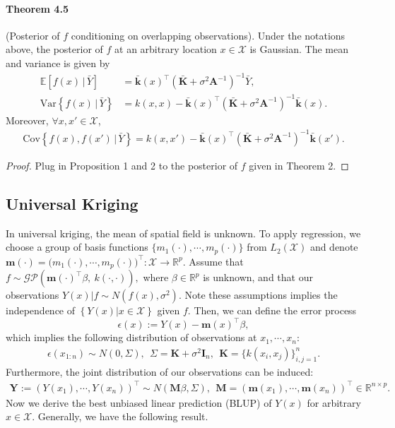 \documentclass{article}
\begin{document}
\paragraph{Theorem 4.5} (Posterior of $f$ conditioning on overlapping observations). Under the notations above, the posterior of $f$ at an arbitrary location $x\in\mathcal{X}$ is Gaussian. The mean and variance is given by
\begin{align*}\mathbb{E}\left[f(x)\,|\,\bar{Y}\right] &= \bar{\mathbf{k}}(x)^\top\left(\bar{\mathbf{K}} + \sigma^2\mathbf{A}^{-1}\right)^{-1}\bar{Y},\tag{4.24}\\
\mathrm{Var}\left\lbrace f(x)\,|\,\bar{Y}\right\rbrace &= k(x,x) - \bar{\mathbf{k}}(x)^\top\left(\bar{\mathbf{K}} + \sigma^2\mathbf{A}^{-1}\right)^{-1}\bar{\mathbf{k}}(x).\tag{4.25}
\end{align*}
Moreover, $\forall x,x'\in\mathcal{X}$,
\begin{align*}
\mathrm{Cov}\left\lbrace f(x), f(x')\,|\,\bar{Y}\right\rbrace = k(x,x') - \bar{\mathbf{k}}(x)^\top\left(\bar{\mathbf{K}} + \sigma^2\mathbf{A}^{-1}\right)^{-1}\bar{\mathbf{k}}(x').\tag{4.26}
\end{align*}
\begin{proof}
	Plug in Proposition 1 and 2 to the posterior of $f$ given in Theorem 2.
\end{proof} 

\subsection{Universal Kriging}
In universal kriging, the mean of spatial field is unknown. To apply regression, we choose a group of basis functions $\lbrace m_1(\cdot),\cdots,m_p(\cdot)\rbrace$ from $L_2(\mathcal{X})$ and denote $\mathbf{m}(\cdot) = \bigl(m_1(\cdot),\cdots,m_p(\cdot)\bigr)^\top:\mathcal{X}\to\mathbb{R}^p.$ Assume that $f\sim\mathcal{GP}\left(\mathbf{m}(\cdot)^\top\beta,\ k(\cdot,\cdot)\right),$ where $\beta\in\mathbb{R}^p$ is unknown, and that our observations $\left.Y(x)\right\vert f\sim N(f(x),\sigma^2).$ Note these assumptions implies the independence of $\left\lbrace \left.Y(x)\right\vert x\in\mathcal{X}\right\rbrace$ given $f.$ Then, we can define the error process
\begin{equation*}
	\epsilon(x) := Y(x) - \mathbf{m}(x)^\top\beta,\tag{4.27}
\end{equation*}
which implies the following distribution of observations at $x_1,\cdots,x_n$:
\begin{align*}
	\epsilon(x_{1:n})\sim N(0,\Sigma),\ \ \Sigma = \mathbf{K} + \sigma^2\mathbf{I}_n,\ \ \mathbf{K} = \lbrace k(x_i,x_j)\rbrace_{i,j=1}^n.\tag{4.28}
\end{align*}
Furthermore, the joint distribution of our observations can be induced:
\begin{align*}
	\mathbf{Y} := \left(Y(x_1),\cdots,Y(x_n)\right)^\top\sim N\left(\mathbf{M}\beta,\Sigma\right),\ \ \mathbf{M} = \left(\mathbf{m}(x_1),\cdots,\mathbf{m}(x_n)\right)^\top\in\mathbb{R}^{n\times p}.\tag{4.29}
\end{align*}
Now we derive the best unbiased linear prediction (BLUP) of $Y(x)$ for arbitrary $x\in\mathcal{X}.$ Generally, we have the following result.
\end{document}

